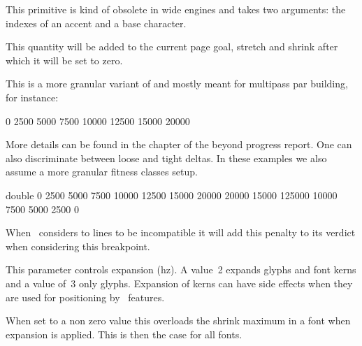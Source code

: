 \stopoldprimitive

\startoldprimitive[title={\prm {accent}}][obsolete=yes]

This primitive is kind of obsolete in wide engines and takes two arguments: the
indexes of an accent and a base character.

\stopoldprimitive

\startnewprimitive[title={\prm {additionalpageskip}}]

This quantity will be added to the current page goal, stretch and shrink after
which it will be set to zero.

\stopnewprimitive

\startnewprimitive[title={\prm {adjacentdemerits}}]

This is a more granular variant of  and mostly meant for multipass
par building, for instance:

\starttyping
{} 0 2500 5000 7500 10000 12500 15000 20000
\stoptyping

More details can be found in the  chapter of the \quote
{beyond} progress report. One can also discriminate between loose and tight
deltas. In these examples we also assume a more granular fitness classes setup.

\starttyping
{} double
        0  2500   5000  7500 10000 12500 15000 20000
    20000 15000 125000 10000 7500   5000  2500     0
\stoptyping

\stopnewprimitive

\startoldprimitive[title={\prm {adjdemerits}}]

When \TEX\ considers to lines to be incompatible it will add this penalty to its
verdict when considering this breakpoint.

\stopoldprimitive

\startnewprimitive[title={\prm {adjustspacing}}]

This parameter controls expansion (hz). A value~2 expands glyphs and font kerns
and a value of~3 only glyphs. Expansion of kerns can have side effects when they
are used for positioning by \OPENTYPE\ features.

\stopnewprimitive

\startnewprimitive[title={\prm {adjustspacingshrink}}]

When set to a non zero value this overloads the shrink maximum in a font when
expansion is applied. This is then the case for all fonts.

\stopnewprimitive

